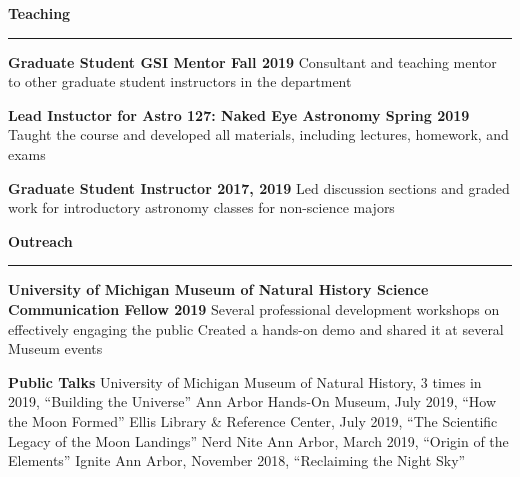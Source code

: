 \documentclass[10pt]{article}
\newcommand{\header}[1]{\vspace{2em}\par \textbf{\large #1}\strut\hrule\vspace{0em}}
\newcommand{\actionHeader}[2]{\textbf{#1 \hfill #2}}
\newcommand{\indentedItem}[1]{\newline\null\qquad #1}
\begin{document}
\header{Teaching}

\actionHeader{Graduate Student GSI Mentor}{Fall 2019}
\indentedItem{Consultant and teaching mentor to other graduate student instructors in the department}

\actionHeader{Lead Instuctor for Astro 127: Naked Eye Astronomy}{Spring 2019}
\indentedItem{Taught the course and developed all materials, including lectures, homework, and exams}

\actionHeader{Graduate Student Instructor}{2017, 2019}
\indentedItem{Led discussion sections and graded work for introductory astronomy classes for non-science majors}




\pagebreak

\header{Outreach}

\actionHeader{University of Michigan Museum of Natural History Science Communication Fellow}{2019}
\indentedItem{Several professional development workshops on effectively engaging the public}
\indentedItem{Created a hands-on demo and shared it at several Museum events}

\actionHeader{Public Talks}{}
\indentedItem{University of Michigan Museum of Natural History, 3 times in 2019, ``Building the Universe''}
\indentedItem{Ann Arbor Hands-On Museum, July 2019, ``How the Moon Formed''}
\indentedItem{Ellis Library \& Reference Center, July 2019, ``The Scientific Legacy of the Moon Landings''}
\indentedItem{Nerd Nite Ann Arbor, March 2019, ``Origin of the Elements''}
\indentedItem{Ignite Ann Arbor, November 2018, ``Reclaiming the Night Sky''}

\end{document}
